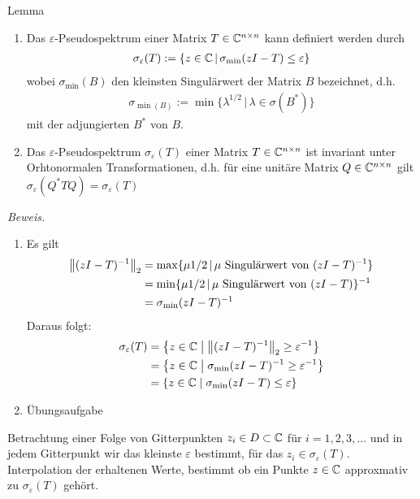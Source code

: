 \begin{thmbox}{Lemma}
  \begin{enumerate}
    \item Das $\varepsilon$-Pseudospektrum einer Matrix $T\in\mathbb C  ^{n\times n}$ kann definiert werden 
      durch
      \begin{align*}\sigma_\varepsilon(T) := \{z\in\mathbb C  \,|\,\sigma_{\min}(zI-T)\leq\varepsilon\}\end{align*}
      wobei $\sigma_{\min}(B)$ den kleinsten Singulärwert der Matrix $B$ bezeichnet, d.h. 
      \begin{align*}\sigma_{\min(B)}:=\min\{\lambda^{1/2}\,|\,\lambda\in\sigma(B^*)\}\end{align*}
      mit der adjungierten $B^*$ von $B$.
    \item Das $\varepsilon$-Pseudospektrum $\sigma_\varepsilon(T)$ einer Matrix $T\in\mathbb C  ^{n\times n}$ ist 
      invariant unter Orhtonormalen Transformationen, d.h. für eine unitäre Matrix $Q\in\mathbb C  ^{n\times n}$ 
      gilt $\sigma_\varepsilon(Q^*TQ) = \sigma_\varepsilon(T)$
  \end{enumerate}
\end{thmbox}
\textit{Beweis.} 
\begin{enumerate}
  \item Es gilt
    \begin{align*}
      \vertn{2}{(zI-T)^{-1}}_2 
      &= \max\{\mu{1/2}\,|\, \mu \text{ Singulärwert von } (zI-T)^{-1}\}  \\
      &= \min\{\mu{1/2}\,|\, \mu \text{ Singulärwert von } (zI-T)\}^{-1} \\
      &= \sigma_{\min}(zI-T)^{-1}
    \end{align*}
    Daraus folgt:
    \begin{align*}
      \sigma_\varepsilon(T) 
      &= \left\{ z \in \C   \;\middle|\; \vertn{2}{(zI-T)^{-1}}_2 \geq \varepsilon^{-1} \right\} \\
      &= \left\{ z \in \C   \;\middle|\; \sigma_{\min}(zI-T)^{-1} \geq \varepsilon^{-1} \right\} \\
      &= \left\{ z \in \C   \;\middle|\; \sigma_{\min}(zI-T) \leq \varepsilon \right\}
    \end{align*}
  \item Übungsaufgabe
\end{enumerate}

Betrachtung einer Folge von Gitterpunkten $z_i\in D\subset \mathbb C  $ für $i=1,2,3,\dots$ und in jedem Gitterpunkt
wir das kleinste $\varepsilon$ bestimmt, für das $z_i\in\sigma_\varepsilon(T)$. \\
Interpolation der erhaltenen Werte, bestimmt ob ein Punkte $z\in\mathbb C  $ approxmativ zu $\sigma_\varepsilon(T)$ gehört.

